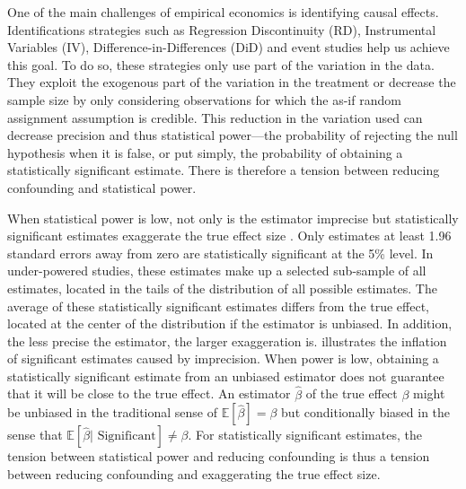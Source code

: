 			One of the main challenges of empirical economics is identifying causal effects. Identifications strategies such as Regression Discontinuity (RD), Instrumental Variables (IV), Difference-in-Differences (DiD) and event studies help us achieve this goal. To do so, these strategies only use part of the variation in the data. They exploit the exogenous part of the variation in the treatment or decrease the sample size by only considering observations for which the as-if random assignment assumption is credible. This reduction in the variation used can decrease precision and thus statistical power---the probability of rejecting the null hypothesis when it is false, or put simply, the probability of obtaining a statistically significant estimate. There is therefore a tension between reducing confounding and statistical power.
			
			When statistical power is low, not only is the estimator imprecise but statistically significant estimates exaggerate the true effect size \citep{ioannidis_why_2008, gelman_beyond_2014, lu_note_2019, zwet_significance_2021}. Only estimates at least 1.96 standard errors away from zero are statistically significant at the 5\% level. In under-powered studies, these estimates make up a selected sub-sample of all estimates, located in the tails of the distribution of all possible estimates. The average of these statistically significant estimates differs from the true effect, located at the center of the distribution if the estimator is unbiased. In addition, the less precise the estimator, the larger exaggeration is.   illustrates the inflation of significant estimates caused by imprecision. When power is low, obtaining a statistically significant estimate from an unbiased estimator does not guarantee that it will be close to the true effect. An estimator $\hat{\beta}$ of the true effect $\beta$ might be unbiased in the traditional sense of $\mathbb{E}[\hat{\beta}] = \beta$ but conditionally biased in the sense that $\mathbb{E}[\hat{\beta} | \text{ Significant}] \neq \beta$. For statistically significant estimates, the tension between statistical power and reducing confounding is thus a tension between reducing confounding and exaggerating the true effect size.
			
